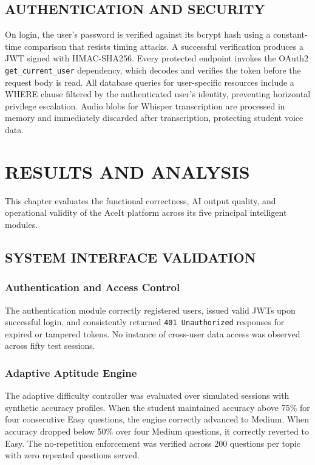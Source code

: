 \documentclass[12pt,a4paper]{report}
\begin{document}
\section{AUTHENTICATION AND SECURITY}

On login, the user's password is verified against its bcrypt hash using a constant-time comparison that resists timing attacks. A successful verification produces a JWT signed with HMAC-SHA256. Every protected endpoint invokes the OAuth2 \texttt{get\_current\_user} dependency, which decodes and verifies the token before the request body is read. All database queries for user-specific resources include a WHERE clause filtered by the authenticated user's identity, preventing horizontal privilege escalation. Audio blobs for Whisper transcription are processed in memory and immediately discarded after transcription, protecting student voice data.

\chapter{RESULTS AND ANALYSIS}

This chapter evaluates the functional correctness, AI output quality, and operational validity of the AceIt platform across its five principal intelligent modules.

\section{SYSTEM INTERFACE VALIDATION}

\subsection{Authentication and Access Control}

The authentication module correctly registered users, issued valid JWTs upon successful login, and consistently returned \texttt{401 Unauthorized} responses for expired or tampered tokens. No instance of cross-user data access was observed across fifty test sessions.

\subsection{Adaptive Aptitude Engine}

The adaptive difficulty controller was evaluated over simulated sessions with synthetic accuracy profiles. When the student maintained accuracy above 75\% for four consecutive Easy questions, the engine correctly advanced to Medium. When accuracy dropped below 50\% over four Medium questions, it correctly reverted to Easy. The no-repetition enforcement was verified across 200 questions per topic with zero repeated questions served.
\end{document}
